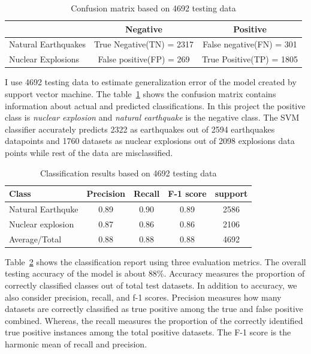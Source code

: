 \documentclass[12pt]{article}
\begin{document}
        \begin{table}[!htb]
            \caption{Confusion matrix based on 4692 testing data} \vspace{0.5em}
            \label{tab:confusion_matrix}
            \centering
            \begin{tabular}{l c c}
            \hline
             & Negative & Positive\\
            \hline
            Natural Earthquakes & True Negative(TN) = 2317 & False negative(FN) = 301 \\
            Nuclear Explosions & False positive(FP) = 269 & True Positive(TP) = 1805 \\
            \hline
            \end{tabular}
        \end{table}
    
        I use 4692 testing data to estimate generalization error of the model created by support vector machine. The table~\ref{tab:confusion_matrix} shows the confusion matrix contains information about actual and predicted classifications. In this project the positive class is \textit{nuclear explosion} and \textit{natural earthquake} is the negative class. The SVM classifier accurately predicts 2322 as earthquakes out of 2594 earthquakes datapoints and 1760  datasets as nuclear explosions out of 2098 explosions data points while rest of the data are misclassified.
        
        \begin{table}[!htb]
            \caption{Classification results based on 4692 testing data} \vspace{0.5em}
            \label{tab:classification_report}
            \centering
            \begin{tabular}{l c c c c}
                \hline
                Class & Precision & Recall & F-1 score & support\\
                \hline
                Natural Earthquke & 0.89 & 0.90 & 0.89 & 2586 \\
                Nuclear explosion & 0.87 & 0.86 & 0.86 & 2106\\
                Average/Total & 0.88 & 0.88 & 0.88 &4692\\[1ex]
                \hline
            \end{tabular}
        \end{table}
    
        Table~\ref{tab:classification_report} shows the classification report using three evaluation metrics. The overall testing accuracy of the model is about $88\%$.  Accuracy measures the proportion of correctly classified classes out of total test datasets. In addition to accuracy, we also consider precision, recall, and f-1 scores. Precision measures how many datasets are correctly classified as true positive among the true and false positive combined.  Whereas, the recall measures the proportion of the correctly identified true positive instances among the total positive datasets. The F-1 score is the harmonic mean of recall and precision.
\end{document}
